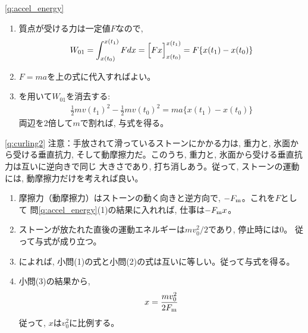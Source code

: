 \ref{q:accel_energy}
\begin{enumerate}
\item 質点が受ける力は一定値$F$なので, 
\begin{eqnarray*}W_{01}=\int_{x(t_0)}^{x(t_1)}Fdx=\Bigl[Fx\Bigr]_{x(t_0)}^{x(t_1)}=F\{x(t_1)-x(t_0)\}\end{eqnarray*}
\item $F=ma$を上の式に代入すればよい。
\item {}を用いて$W_{01}$を消去する:
\begin{eqnarray*}
\frac{1}{2}mv(t_1)^2-\frac{1}{2}mv(t_0)^2=ma\{x(t_1)-x(t_0)\}
\end{eqnarray*}
両辺を2倍して$m$で割れば, 与式を得る。
\end{enumerate}
\vspace{0.4cm}

\ref{q:curling2}
注意：手放されて滑っているストーンにかかる力は, 重力と, 氷面から受ける垂直抗力, 
そして動摩擦力だ。このうち, 重力と, 氷面から受ける垂直抗力は互いに逆向きで同じ
大きさであり, 打ち消しあう。従って, ストーンの運動には, 動摩擦力だけを考えれば良い。
\begin{enumerate}
\item 摩擦力（動摩擦力）はストーンの動く向きと逆方向で, $-F_{\text m}$。これを$F$として
問\ref{q:accel_energy}(1)の結果に入れれば, 仕事は$-F_{\text m}x$。
\item ストーンが放たれた直後の運動エネルギーは$mv_0^2/2$であり, 停止時には0。
従って与式が成り立つ。
\item {}によれば, 小問(1)の式と小問(2)の式は互いに等しい。従って与式を得る。
\item 小問(3)の結果から, 
\begin{eqnarray}x=\frac{mv_0^2}{2F_{\text m}}\end{eqnarray}
従って, $x$は$v_0^2$に比例する。
\end{enumerate}
\vspace{0.4cm}

